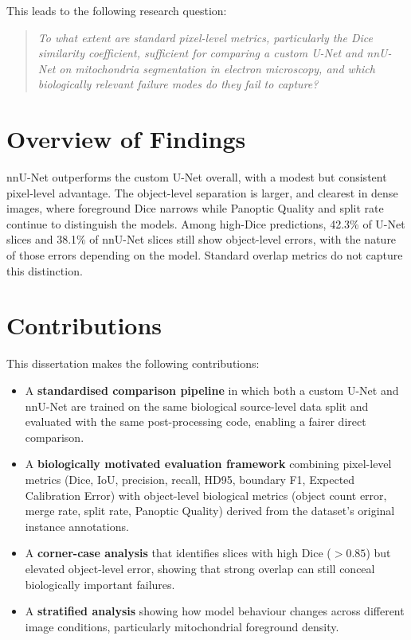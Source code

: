 \documentclass[logo,bsc,singlespacing,parskip,online]{infthesis}
\begin{document}
This leads to the following research question:

\begin{quote}
\emph{To what extent are standard pixel-level metrics, particularly the Dice
similarity coefficient, sufficient for comparing a custom U-Net and nnU-Net on
mitochondria segmentation in electron microscopy, and which biologically
relevant failure modes do they fail to capture?}
\end{quote}

\section{Overview of Findings}

nnU-Net outperforms the custom U-Net overall, with a modest but consistent
pixel-level advantage. The object-level separation is larger, and clearest
in dense images, where foreground Dice narrows while Panoptic
Quality and split rate continue to distinguish the models. Among high-Dice
predictions, 42.3\% of U-Net slices and 38.1\% of nnU-Net slices still
show object-level errors, with the nature of those errors depending on the
model. Standard overlap metrics do not capture this distinction.

\section{Contributions}

This dissertation makes the following contributions:

\begin{itemize}

\item A \textbf{standardised comparison pipeline} in which both a custom U-Net
and nnU-Net are trained on the same biological source-level data split and
evaluated with the same post-processing code, enabling a fairer
direct comparison.

\item A \textbf{biologically motivated evaluation framework} combining pixel-level metrics (Dice,
IoU, precision, recall, HD95, boundary F1, Expected Calibration Error) with
object-level biological metrics (object count error, merge rate, split rate,
Panoptic Quality) derived from the dataset's original instance annotations.

\item A \textbf{corner-case analysis} that identifies slices with
high Dice ($>0.85$) but elevated object-level error, showing that strong
overlap can still conceal biologically important failures.

\item A \textbf{stratified analysis} showing how model behaviour changes across
different image conditions, particularly mitochondrial foreground density.

\end{itemize}
\end{document}
